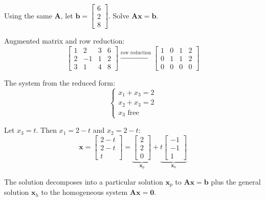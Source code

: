 \begin{example}
  Using the same $\mathbf{A}$, let
  $\mathbf{b} =
    \begin{bmatrix}
      6 \\ 2 \\ 8
    \end{bmatrix}
  $.
  Solve $\mathbf{A}\mathbf{x} = \mathbf{b}$.

  Augmented matrix and row reduction:
  \[
    \left[
      \begin{array}{ccc|c}
        1 & 2  & 3 & 6 \\
        2 & -1 & 1 & 2 \\
        3 & 1  & 4 & 8
      \end{array}
      \right]
    \xrightarrow{\text{row reduction}}
    \left[
      \begin{array}{ccc|c}
        1 & 0 & 1 & 2 \\
        0 & 1 & 1 & 2 \\
        0 & 0 & 0 & 0
      \end{array}
      \right]
  \]

  The system from the reduced form:
  \[
    \begin{cases}
      x_1 + x_3 = 2 \\
      x_2 + x_3 = 2 \\
      x_3 \text{ free}
    \end{cases}
  \]

  Let $x_3 = t$. Then $x_1 = 2 - t$ and $x_2 = 2 - t$:
  \[
    \mathbf{x}
    =
    \begin{bmatrix}
      2 - t \\ 2 - t \\ t
    \end{bmatrix}
    = \underbrace{
      \begin{bmatrix}
        2 \\ 2 \\ 0
      \end{bmatrix}
    }_{\mathbf{x}_p}
    + \underbrace{t
      \begin{bmatrix}
        -1 \\ -1 \\ 1
      \end{bmatrix}
    }_{\mathbf{x}_h}
  \]

  The solution decomposes into a particular solution $\mathbf{x}_p$ to $\mathbf{A}\mathbf{x} = \mathbf{b}$ plus the general solution $\mathbf{x}_h$ to the homogeneous system $\mathbf{A}\mathbf{x} = \mathbf{0}$.
\end{example}

